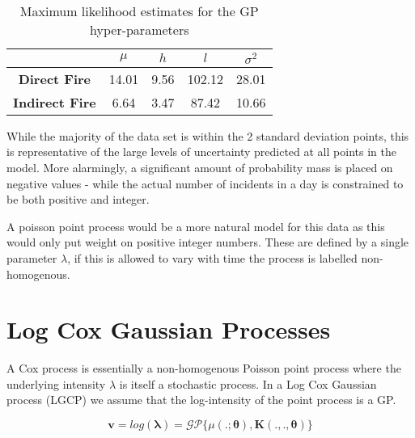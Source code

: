 \documentclass[a4paper,11pt]{report}
\begin{document}
\singlespacing
\begin{table}[]
\centering
\caption{Maximum likelihood estimates for the GP hyper-parameters}
\label{GPhyperparameters}
\begin{tabular}{c|c|c|c|c|}
\cline{2-5}
\textbf{}                                    & \(\mu\) & \(h\) & \(l\) & \(\sigma^2\) \\ \hline
\multicolumn{1}{|c|}{\textbf{Direct Fire}}   & 14.01           & 9.56          & 102.12          & 28.01              \\ \hline
\multicolumn{1}{|c|}{\textbf{Indirect Fire}} & 6.64           & 3.47          & 87.42          & 10.66              \\ \hline
\end{tabular}
\end{table}
\doublespacing

While the majority of the data set is within the 2 standard deviation points, this is representative of the large levels of uncertainty predicted at all points in the model. More alarmingly, a significant amount of probability mass is placed on negative values - while the actual number of incidents in a day is constrained to be both positive and integer. \par 


A poisson point process would be a more natural model for this data as this would only put weight on positive integer numbers. These are defined by a single parameter \(\lambda\), if this is allowed to vary with time the process is labelled non-homogenous. 


\chapter{Log Cox Gaussian Processes}


A Cox process is essentially a non-homogenous Poisson point process where the underlying intensity \(\lambda\) is itself a stochastic process. In a Log Cox Gaussian process (LGCP) we assume that the log-intensity of the point process is a GP. 

\begin{equation} \label{eq:LGCPsetup}
\mathbf{v} = log(\boldsymbol{\lambda}) = \mathcal{G}\mathcal{P} \{ \mu(. ;\boldsymbol{\theta}) , \mathbf{K}(. , . ,\boldsymbol{\theta})\}
\end{equation}
\end{document}
